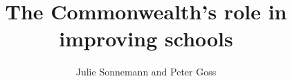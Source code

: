 \documentclass{grattan}
\author{Julie Sonnemann and Peter Goss}
\title{The Commonwealth’s role in improving schools}
\begin{document}

\contentspage
\listoffigures









\printbibliography
\end{document}
